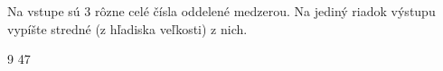 




Na vstupe sú 3 rôzne celé čísla oddelené medzerou. Na jediný riadok výstupu vypíšte stredné (z hľadiska veľkosti) z nich.

 9 47
\koniec


